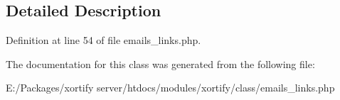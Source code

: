 \subsection{Detailed Description}


Definition at line 54 of file emails\-\_\-links.\-php.



The documentation for this class was generated from the following file\-:\begin{DoxyCompactItemize}
\item 
E\-:/\-Packages/xortify server/htdocs/modules/xortify/class/emails\-\_\-links.\-php\end{DoxyCompactItemize}
